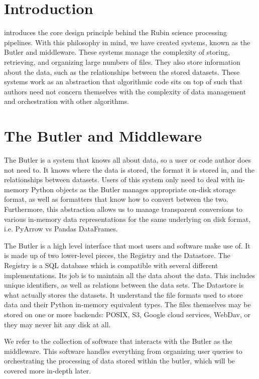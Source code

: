 \section{Introduction}

\citet{I08_adassxxxii} introduces the core design principle behind the Rubin science processing pipelines. With this philosophy in mind, we have created systems, known as the Butler and middleware. These systems manage the complexity of storing, retrieving, and organizing large numbers of files. They also store information about the data, such as the relationships between the stored datasets. These systems work as an abstraction that algorithmic code sits on top of such that authors need not concern themselves with the complexity of data management and orchestration with other algorithms.

\section{The Butler and Middleware}
The Butler is a system that knows all about data, so a user or code author does not need to. It knows where the data is stored, the format it is stored in, and the relationships between datasets. Users of this system only need to deal with in-memory Python objects as the Butler manages appropriate on-disk storage format, as well as formatters that know how to convert between the two. Furthermore, this abstraction allows us to manage transparent conversions to various in-memory data representations for the same underlying on disk format, i.e. PyArrow vs Pandas DataFrames.

The Butler is a high level interface that most users and software make use of. It is made up of two lower-level pieces, the Registry and the Datastore. The Registry is a SQL database which is compatible with several different implementations. Its job is to maintain all the data about the data. This includes unique identifiers, as well as relations between the data sets. The Datastore is what actually stores the datasets. It understand the file formats used to store data and their Python in-memory equivalent types. The files themselves may be stored on one or more backends: POSIX, S3, Google cloud services, WebDav, or they may never hit any disk at all.

We refer to the collection of software that interacts with the Butler as the middleware. This software handles everything from organizing user queries to orchestrating the processing of data stored within the butler, which will be covered more in-depth later.

